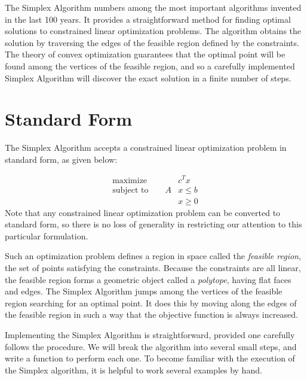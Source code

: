 \label{lab:Simplex}

The Simplex Algorithm numbers among the most important algorithms invented in the last 100 years.
It provides a straightforward method for finding optimal solutions to constrained linear optimization problems.
The algorithm obtains the solution by traversing the edges of the feasible region defined by the constraints.
The theory of convex optimization guarantees that the optimal point will be found among the vertices of the feasible
region, and so a carefully implemented Simplex Algorithm will discover the exact solution in a finite number of steps.

\section{Standard Form}
The Simplex Algorithm accepts a constrained linear optimization problem in standard form,
as given below:

\begin{align*}
\text{maximize}\qquad &c^Tx \\
\text{subject to}\qquad A&x \leq b \\
 &x \geq 0
\end{align*}
Note that any constrained linear optimization problem can be converted to standard form, so there is no loss of
generality in restricting our attention to this particular formulation.

Such an optimization problem defines a region in space called the \emph{feasible region}, the set of points
satisfying the constraints. Because the constraints are all linear, the feasible region forms a geometric object
called a \emph{polytope}, having flat faces and edges.
The Simplex Algorithm jumps among the vertices of the feasible region searching for an optimal point.
It does this by moving along the edges of the feasible region in such a way that the objective function is always increased.

Implementing the Simplex Algorithm is straightforward, provided one carefully follows the procedure.
We will break the algorithm into several small steps, and write a function to perform each one.
To become familiar with the execution of the Simplex algorithm, it is helpful to work several examples by hand.

